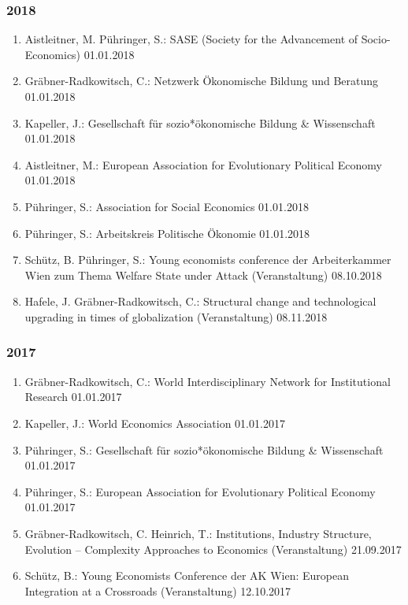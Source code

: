 \subsubsection*{2018}
\begin{enumerate}
	\item Aistleitner, M. Pühringer, S.: SASE (Society for the Advancement of Socio-Economics) 01.01.2018
	\item Gräbner-Radkowitsch, C.: Netzwerk Ökonomische Bildung und Beratung 01.01.2018
	\item Kapeller, J.: Gesellschaft für sozio*ökonomische Bildung \& Wissenschaft 01.01.2018
	\item Aistleitner, M.: European Association for Evolutionary Political Economy 01.01.2018
	\item Pühringer, S.: Association for Social Economics 01.01.2018
	\item Pühringer, S.: Arbeitskreis Politische Ökonomie 01.01.2018
	\item Schütz, B. Pühringer, S.: Young economists conference der Arbeiterkammer Wien zum Thema \glqq Welfare State under Attack\grqq{} (Veranstaltung) 08.10.2018
	\item Hafele, J. Gräbner-Radkowitsch, C.: Structural change and technological upgrading in times of globalization (Veranstaltung) 08.11.2018
\end{enumerate}
\subsubsection*{2017}
\begin{enumerate}
	\item Gräbner-Radkowitsch, C.: World Interdisciplinary Network for Institutional Research 01.01.2017
	\item Kapeller, J.: World Economics Association 01.01.2017
	\item Pühringer, S.: Gesellschaft für sozio*ökonomische Bildung \& Wissenschaft 01.01.2017
	\item Pühringer, S.: European Association for Evolutionary Political Economy 01.01.2017
	\item Gräbner-Radkowitsch, C. Heinrich, T.: Institutions, Industry Structure, Evolution -- Complexity Approaches to Economics (Veranstaltung) 21.09.2017
	\item Schütz, B.: Young Economists Conference der AK Wien: European Integration at a Crossroads (Veranstaltung) 12.10.2017
\end{enumerate}
